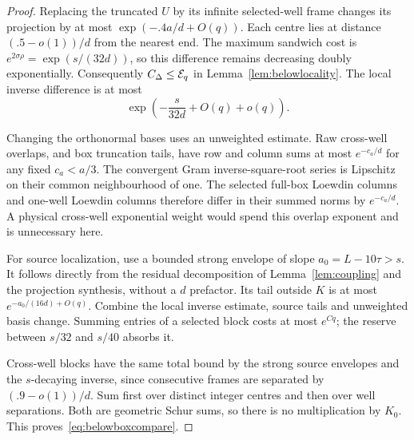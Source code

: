 \begin{proof}
Replacing the truncated $U$ by its infinite selected-well frame changes its projection by at most $\exp(-.4a/d+O(q))$. Each centre lies at distance $(.5-o(1))/d$ from the nearest end. The maximum sandwich cost is
$e^{2\sigma\rho}=\exp(s/(32d))$, so this difference remains decreasing doubly exponentially. Consequently $C_\Delta\le\mathcal E_q$ in Lemma~\ref{lem:belowlocality}. The local inverse difference is at most
\[
 \exp\left(-\frac{s}{32d}+O(q)+o(q)\right).
\]

Changing the orthonormal bases uses an unweighted estimate. Raw cross-well overlaps, and box truncation tails, have row and column sums at most $e^{-c_a/d}$ for any fixed $c_a<a/3$. The convergent Gram inverse-square-root series is Lipschitz on their common neighbourhood of one. The selected full-box Loewdin columns and one-well Loewdin columns therefore differ in their summed norms by $e^{-c_a/d}$. A physical cross-well exponential weight would spend this overlap exponent and is unnecessary here.

For source localization, use a bounded strong envelope of slope $a_0=L-10\tau>s$. It follows directly from the residual decomposition of Lemma~\ref{lem:coupling} and the projection synthesis, without a $d$ prefactor. Its tail outside $K$ is at most $e^{-a_0/(16d)+O(q)}$. Combine the local inverse estimate, source tails and unweighted basis change. Summing entries of a selected block costs at most $e^{Cq}$; the reserve between $s/32$ and $s/40$ absorbs it.

Cross-well blocks have the same total bound by the strong source envelopes and the $s$-decaying inverse, since consecutive frames are separated by $(.9-o(1))/d$. Sum first over distinct integer centres and then over well separations. Both are geometric Schur sums, so there is no multiplication by $K_0$. This proves~\eqref{eq:belowboxcompare}.
\end{proof}


